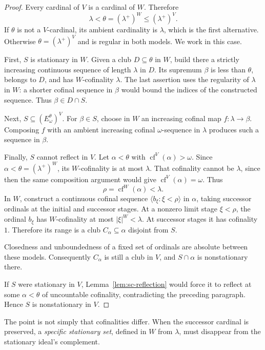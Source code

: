 \documentclass[11pt,letterpaper]{article}
\theoremstyle{definition}
\numberwithin{equation}{section}
\newcommand{\cf}{\operatorname{cf}}
\begin{document}
\begin{proof}
Every cardinal of $V$ is a cardinal of $W$. Therefore
\[
\lambda<\theta=(\lambda^+)^W\le(\lambda^+)^V.
\]
If $\theta$ is not a $V$-cardinal, its ambient cardinality is $\lambda$, which is the first alternative. Otherwise $\theta=(\lambda^+)^V$ and is regular in both models. We work in this case.

First, $S$ is stationary in $W$. Given a club $D\subseteq\theta$ in $W$, build there a strictly increasing continuous sequence of length $\lambda$ in $D$. Its supremum $\beta$ is less than $\theta$, belongs to $D$, and has $W$-cofinality $\lambda$. The last assertion uses the regularity of $\lambda$ in $W$: a shorter cofinal sequence in $\beta$ would bound the indices of the constructed sequence. Thus $\beta\in D\cap S$.

Next, $S\subseteq(E^\theta_\omega)^V$. For $\beta\in S$, choose in $W$ an increasing cofinal map $f:\lambda\to\beta$. Composing $f$ with an ambient increasing cofinal $\omega$-sequence in $\lambda$ produces such a sequence in $\beta$.

Finally, $S$ cannot reflect in $V$. Let $\alpha<\theta$ with $\cf^V(\alpha)>\omega$. Since $\alpha<\theta=(\lambda^+)^W$, its $W$-cofinality is at most $\lambda$. That cofinality cannot be $\lambda$, since then the same composition argument would give $\cf^V(\alpha)=\omega$. Thus
\[
\rho=\cf^W(\alpha)<\lambda.
\]
In $W$, construct a continuous cofinal sequence $\langle b_\xi:\xi<\rho\rangle$ in $\alpha$, taking successor ordinals at the initial and successor stages. At a nonzero limit stage $\xi<\rho$, the ordinal $b_\xi$ has $W$-cofinality at most $|\xi|^W<\lambda$. At successor stages it has cofinality $1$. Therefore its range is a club $C_\alpha\subseteq\alpha$ disjoint from $S$.

Closedness and unboundedness of a fixed set of ordinals are absolute between these models. Consequently $C_\alpha$ is still a club in $V$, and $S\cap\alpha$ is nonstationary there.

If $S$ were stationary in $V$, Lemma~\ref{lem:sc-reflection} would force it to reflect at some $\alpha<\theta$ of uncountable cofinality, contradicting the preceding paragraph. Hence $S$ is nonstationary in $V$.
\end{proof}

The point is not simply that cofinalities differ. When the successor cardinal is preserved, a \emph{specific stationary set}, defined in $W$ from $\lambda$, must disappear from the stationary ideal's complement.
\end{document}
